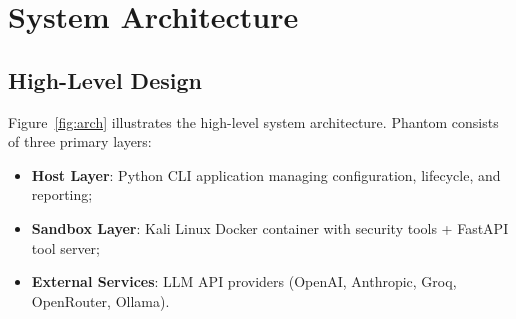 \documentclass[12pt,a4paper]{article}
\begin{document}
\section{System Architecture}

\subsection{High-Level Design}

Figure~\ref{fig:arch} illustrates the high-level system architecture. Phantom consists of three primary layers:

\begin{itemize}
  \item \textbf{Host Layer}: Python CLI application managing configuration, lifecycle, and reporting;
  \item \textbf{Sandbox Layer}: Kali Linux Docker container with security tools + FastAPI tool server;
  \item \textbf{External Services}: LLM API providers (OpenAI, Anthropic, Groq, OpenRouter, Ollama).
\end{itemize}
\end{document}
